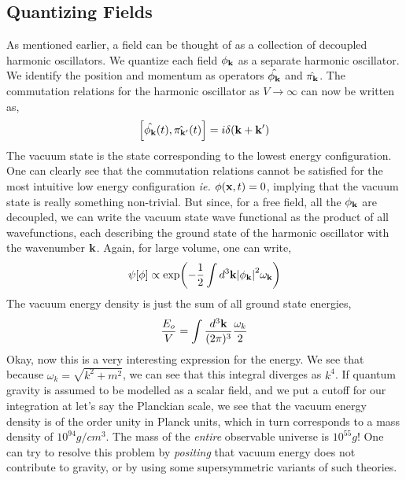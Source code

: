 \documentclass[a4paper,11pt]{article}
\begin{document}
\subsection{Quantizing Fields}
As mentioned earlier, a field can be thought of as a collection of decoupled harmonic oscillators. We quantize each field $\phi_{\vb{k}}$ as a separate harmonic oscillator. We identify the position and momentum as operators $\hat{\phi_{\vb{k}}}$ and $\hat{\pi_{\vb{k}}}$. The commutation relations for the harmonic oscillator as $V\rightarrow \infty$ can now be written as,
$$\comm{\hat{\phi_{\vb{k}}}(t)}{\hat{\pi_{\vb{k'}}}(t)} = i \delta(\vb{k}+\vb{k'})$$
The vacuum state is the state corresponding to the lowest energy configuration. One can clearly see that the commutation relations cannot be satisfied for the most intuitive low energy configuration \textit{ie.} $\phi(\vb{x},t) = 0$, implying that the vacuum state is really something non-trivial. But since, for a free field, all the $\phi_{\vb{k}}$ are decoupled, we can write the vacuum state wave functional as the product of all wavefunctions, each describing the ground state of the harmonic oscillator with the wavenumber $\vb{k}$. Again, for large volume, one can write,
$$\psi[\phi] \propto \exp(-\frac{1}{2}\int d^3 \vb{k} \abs{\phi_{\vb{k}}}^2 \omega_{\vb{k}})$$
The vacuum energy density is just the sum of all ground state energies,
$$\frac{E_o}{V}= \int\frac{d^3 \vb{k}}{(2\pi)^3} \frac{\omega_{k}}{2}$$
Okay, now this is a very interesting expression for the energy. We see that because $\omega_k = \sqrt{k^2+m^2}$, we can see that this integral diverges as $k^4$. If quantum gravity is assumed to be modelled as a scalar field, and we put a cutoff for our integration at let's say the Planckian scale, we see that the vacuum energy density is of the order unity in Planck units, which in turn corresponds to a mass density of $10^{94} g/cm^3$. The mass of the \textit{entire} observable universe is $10^{55}g$! One can try to resolve this problem by \textit{positing} that vacuum energy does not contribute to gravity, or by using some supersymmetric variants of such theories.
\end{document}
